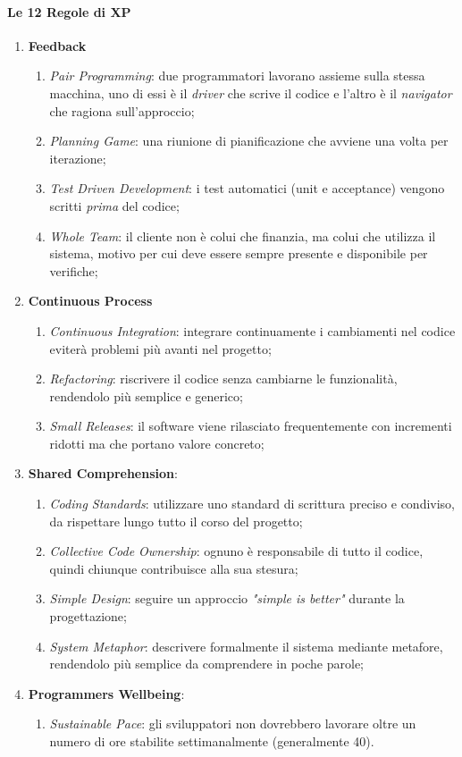 \documentclass[a4paper,12pt]{report}
\begin{document}
				\paragraph{Le 12 Regole di XP}
				\begin{enumerate}
					\item \textbf{Feedback}
						\begin{enumerate}
							\item \emph{Pair Programming}: due programmatori lavorano assieme sulla stessa macchina, uno di essi è il \emph{driver} che scrive il codice e l'altro è il \emph{navigator} che ragiona sull'approccio;
							\item \emph{Planning Game}: una riunione di pianificazione che avviene una volta per iterazione;
							\item \emph{Test Driven Development}: i test automatici (unit e acceptance) vengono scritti \emph{prima} del codice;
							\item \emph{Whole Team}: il cliente non è colui che finanzia, ma colui che utilizza il sistema, motivo per cui deve essere sempre presente e disponibile per verifiche;
						\end{enumerate}
					\item \textbf{Continuous Process}
						\begin{enumerate}
							\item \emph{Continuous Integration}: integrare continuamente i cambiamenti nel codice eviterà problemi più avanti nel progetto;
							\item \emph{Refactoring}: riscrivere il codice senza cambiarne le funzionalità, rendendolo più semplice e generico;
							\item \emph{Small Releases}: il software viene rilasciato frequentemente con incrementi ridotti ma che portano valore concreto;
						\end{enumerate}
					\item \textbf{Shared Comprehension}:
						\begin{enumerate}
							\item \emph{Coding Standards}: utilizzare uno standard di scrittura preciso e condiviso, da rispettare lungo tutto il corso del progetto;
							\item \emph{Collective Code Ownership}: ognuno è responsabile di tutto il codice, quindi chiunque contribuisce alla sua stesura;
							\item \emph{Simple Design}: seguire un approccio \emph{"simple is better"} durante la progettazione;
							\item \emph{System Metaphor}: descrivere formalmente il sistema mediante metafore, rendendolo più semplice da comprendere in poche parole;
						\end{enumerate}
					\item \textbf{Programmers Wellbeing}:
						\begin{enumerate}
							\item \emph{Sustainable Pace}: gli sviluppatori non dovrebbero lavorare oltre un numero di ore stabilite settimanalmente (generalmente 40).
						\end{enumerate}
				\end{enumerate}
			
\end{document}

